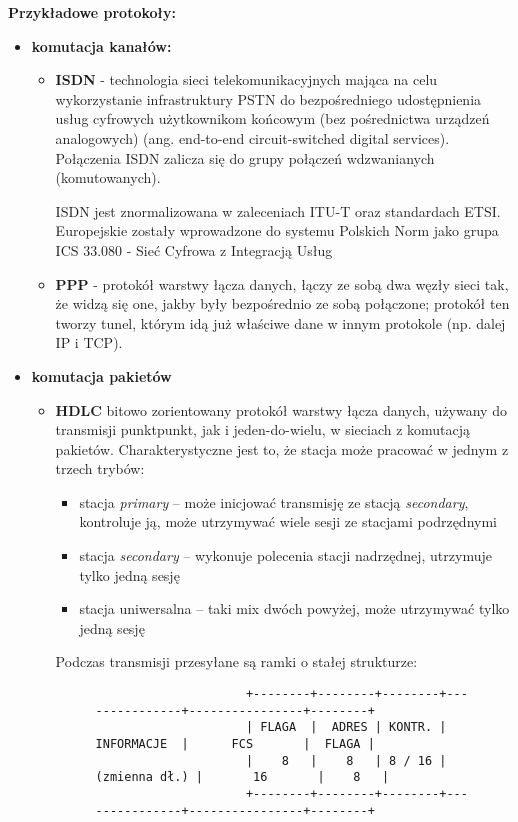\textbf{Przykładowe protokoły:}
\begin{itemize}
	\setlength\itemsep{1pt}
	\item \textbf{komutacja kanałów:}
	\begin{itemize}
		\setlength\itemsep{1pt}
		\item \textbf{ISDN} - technologia sieci telekomunikacyjnych mająca na celu wykorzystanie infrastruktury PSTN do bezpośredniego udostępnienia usług cyfrowych użytkownikom końcowym (bez pośrednictwa urządzeń analogowych) (ang. end-to-end circuit-switched digital services). Połączenia ISDN zalicza się do grupy połączeń wdzwanianych (komutowanych).
		
		ISDN jest znormalizowana w zaleceniach ITU-T oraz standardach ETSI. Europejskie zostały wprowadzone do systemu Polskich Norm jako grupa ICS 33.080 - Sieć Cyfrowa z Integracją Usług
		\item \textbf{PPP} - protokół warstwy łącza danych, łączy ze sobą dwa węzły sieci tak, że widzą się one, jakby były bezpośrednio ze sobą połączone; protokół ten tworzy tunel, którym idą już właściwe dane w innym protokole (np. dalej IP i TCP).
	\end{itemize}
	\item \textbf{komutacja pakietów}
	\begin{itemize}
		\setlength\itemsep{1pt}
		\item \textbf{HDLC} bitowo zorientowany protokół warstwy łącza danych, używany do transmisji punktpunkt, jak i jeden-do-wielu, w sieciach z komutacją pakietów. Charakterystyczne jest to, że stacja może pracować w jednym z trzech trybów:
		
		\begin{itemize}
			\setlength\itemsep{1pt}
			\item stacja \textit{primary} – może inicjować transmisję ze stacją \textit{secondary}, kontroluje ją, może utrzymywać wiele sesji ze stacjami podrzędnymi
			\item stacja \textit{secondary} – wykonuje polecenia stacji nadrzędnej, utrzymuje tylko jedną sesję
			\item stacja uniwersalna – taki mix dwóch powyżej, może utrzymywać tylko jedną sesję
		\end{itemize}
		
		Podczas transmisji przesyłane są ramki o stałej strukturze:
		\begin{figure}[H]
			\begin{verbatim}
			         +--------+--------+--------+---------------+----------------+--------+
			         | FLAGA  |  ADRES | KONTR. |   INFORMACJE  |      FCS       |  FLAGA |
			         |    8   |    8   | 8 / 16 | (zmienna dł.) |       16       |    8   |
			         +--------+--------+--------+---------------+----------------+--------+
			\end{verbatim}
		\end{figure}
		

\end{itemize}
\end{itemize}
